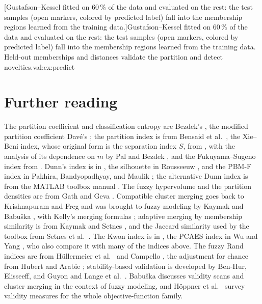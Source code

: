 [Gustafson--Kessel fitted on 60\,\% of the data and evaluated on the rest: the test samples (open markers, colored by predicted label) fall into the membership regions learned from the training data.]{Gustafson--Kessel fitted on 60\,\% of the data and evaluated on the rest: the test samples (open markers, colored by predicted label) fall into the membership regions learned from the training data. Held-out memberships and distances validate the partition and detect novelties.}{val:ex:predict}

\section{Further reading}\label{sec:val:reading}
\enlargethispage{3\baselineskip}%

The partition coefficient and classification entropy are Bezdek's \cite{bezdek:1981}, the modified partition coefficient Dav\'e's \cite{dave:1996:mpc}; the partition index is from Bensaid et al.\ \cite{bensaid:1996:validity}, the Xie--Beni index, whose original form is the separation index $S$, from \cite{xie:1991:validity}, with the analysis of its dependence on $m$ by Pal and Bezdek \cite{pal:1995:validity}, and the Fukuyama--Sugeno index from \cite{fukuyama:1989:validity}. Dunn's index is in \cite{dunn:1974:validity}, the silhouette in Rousseeuw \cite{rousseeuw:1987:silhouette}, and the PBM-F index in Pakhira, Bandyopadhyay, and Maulik \cite{pakhira:2004:pbmf}; the alternative Dunn index is from the MATLAB toolbox manual \cite{balasko:2005:toolbox}. The fuzzy hypervolume and the partition densities are from Gath and Geva \cite{gath:1989}. Compatible cluster merging goes back to Krishnapuram and Freg \cite{krishnapuram:1992:merging} and was brought to fuzzy modeling by Kaymak and Babu\v{s}ka \cite{kaymak:1995:merging}, with Kelly's merging formulas \cite{kelly:1994:merging}; adaptive merging by membership similarity is from Kaymak and Setnes \cite{kaymak:2002:volume}, and the Jaccard similarity used by the toolbox from Setnes et al.\ \cite{setnes:1998:similarity}. The Kwon index is in \cite{kwon:1998:validity}, the PCAES index in Wu and Yang \cite{wu:2005:pcaes}, who also compare it with many of the indices above. The fuzzy Rand indices are from Hüllermeier et al.\ \cite{hullermeier:2012:rand} and Campello \cite{campello:2007:rand}, the adjustment for chance from Hubert and Arabie \cite{hubert:1985:ari}; stability-based validation is developed by Ben-Hur, Elisseeff, and Guyon \cite{benhur:2002:stability} and Lange et al.\ \cite{lange:2004:stability}. Babu\v{s}ka \cite{babuska:1998:book} discusses validity scans and cluster merging in the context of fuzzy modeling, and H\"oppner et al.\ \cite{hoppner:1999:book} survey validity measures for the whole objective-function family.
